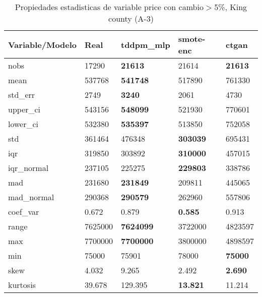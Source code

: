 \begin{table}[H]
\centering
\fontsize{8}{14}\selectfont
\caption{Propiedades estadisticas de variable price con cambio\ensuremath{>}5\%, King county (A-3)}
\label{table-stats-king county-a-3-price-short}
\begin{tabular}{|l|m{10em}|m{10em}|m{10em}|m{10em}|}
\hline
 \rowcolor[gray]{0.8}
Variable/Modelo & Real & tddpm\_mlp & smote-enc & ctgan \\
\hline nobs & 17290 & \bfseries 21613 & \cellcolor[rgb]{0.9, 0.54, 0.52} 21614 & \bfseries 21613 \\
\hline mean & 537768 & \bfseries 541748 & 517890 & \cellcolor[rgb]{0.9, 0.54, 0.52} 761330 \\
\hline std\_err & 2749 & \bfseries 3240 & 2061 & \cellcolor[rgb]{0.9, 0.54, 0.52} 4730 \\
\hline upper\_ci & 543156 & \bfseries 548099 & 521930 & \cellcolor[rgb]{0.9, 0.54, 0.52} 770601 \\
\hline lower\_ci & 532380 & \bfseries 535397 & 513850 & \cellcolor[rgb]{0.9, 0.54, 0.52} 752058 \\
\hline std & 361464 & 476348 & \bfseries 303039 & \cellcolor[rgb]{0.9, 0.54, 0.52} 695431 \\
\hline iqr & 319850 & 303892 & \bfseries 310000 & \cellcolor[rgb]{0.9, 0.54, 0.52} 457015 \\
\hline iqr\_normal & 237105 & 225275 & \bfseries 229803 & \cellcolor[rgb]{0.9, 0.54, 0.52} 338786 \\
\hline mad & 231680 & \bfseries 231849 & 209811 & \cellcolor[rgb]{0.9, 0.54, 0.52} 445065 \\
\hline mad\_normal & 290368 & \bfseries 290579 & 262960 & \cellcolor[rgb]{0.9, 0.54, 0.52} 557806 \\
\hline coef\_var & 0.672 & 0.879 & \bfseries 0.585 & \cellcolor[rgb]{0.9, 0.54, 0.52} 0.913 \\
\hline range & 7625000 & \bfseries 7624099 & \cellcolor[rgb]{0.9, 0.54, 0.52} 3722000 & 4823597 \\
\hline max & 7700000 & \bfseries 7700000 & \cellcolor[rgb]{0.9, 0.54, 0.52} 3800000 & 4898597 \\
\hline min & 75000 & 75901 & \cellcolor[rgb]{0.9, 0.54, 0.52} 78000 & \bfseries 75000 \\
\hline skew & 4.032 & \cellcolor[rgb]{0.9, 0.54, 0.52} 9.265 & 2.492 & \bfseries 2.690 \\
\hline kurtosis & 39.678 & \cellcolor[rgb]{0.9, 0.54, 0.52} 129.395 & \bfseries 13.821 & 11.214 \\

\end{tabular}
\end{table}
